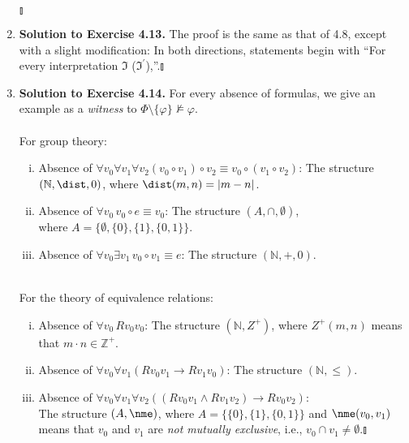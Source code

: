 \begin{enumerate}[1.]
\begin{enumerate}[(a)]
\[\]
\end{enumerate} \begin{flushright}$\talloblong$\end{flushright}
%
\item \textbf{Solution to Exercise 4.13.} The proof is the same as that of 4.8, except with a slight modification: In both directions, statements begin with ``For every interpretation $\mathfrak{I}$ ($\mathfrak{I}^\prime$),''.\nolinebreak\hfill$\talloblong$
%
\item \textbf{Solution to Exercise 4.14.} For every absence of formulas, we give an example as a \textit{witness} to $\Phi \setminus \{ \varphi \} \not \models \varphi$.\\
\ 
\\For group theory:
\begin{enumerate}[(i)]
\item Absence of $\forall v_0 \forall v_1 \forall v_2 ( v_0 \circ v_1 ) \circ v_2 \equiv v_0 \circ ( v_1 \circ v_2 )$: The structure $( \mathbb{N}, \dist, 0 )$, where $\dist(m, n) = |m - n|$.
\item Absence of $\forall v_0 \, v_0 \circ e \equiv v_0$: The structure $(A, \cap, \emptyset)$, \\where $A = \{ \emptyset, \{ 0 \}, \{ 1 \}, \{ 0, 1 \} \}$.
\item Absence of $\forall v_0 \exists v_1 \, v_0 \circ v_1 \equiv e$: The structure $(\mathbb{N}, +, 0)$.
\end{enumerate}
\ 
\\For the theory of equivalence relations:
\begin{enumerate}[(i)]
\item Absence of $\forall v_0 \, Rv_0 v_0$: The structure $(\mathbb{N}, Z^+)$, where $Z^+(m,n)$ means that $m \cdot n \in \mathbb{Z}^+$.
\item Absence of $\forall v_0 \forall v_1 (Rv_0v_1 \rightarrow Rv_1v_0)$: The structure $(\mathbb{N}, \leq)$.
\item Absence of $\forall v_0 \forall v_1 \forall v_2 ((Rv_0v_1 \land Rv_1v_2) \rightarrow Rv_0v_2)$: \\The structure $(A, \nme)$, where $A = \{ \{ 0 \}, \{ 1 \}, \{ 0, 1 \} \}$ and $\nme(v_0, v_1)$ means that $v_0$ and $v_1$ are \textit{not mutually exclusive}, i.e., $v_0 \cap v_1 \not = \emptyset$.\nolinebreak\hfill$\talloblong$

\end{enumerate}
\end{enumerate}
